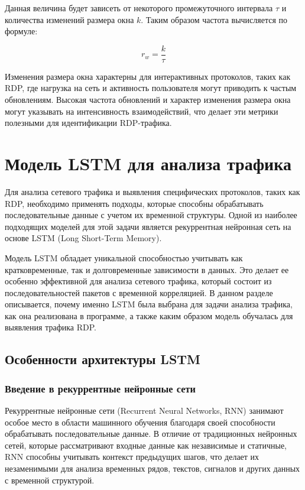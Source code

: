 \documentclass[bachelor, och, coursework]{SCWorks}
\begin{document}
Данная величина будет зависеть от некоторого промежуточного интервала $\tau$ и количества изменений размера окна $k$. Таким образом частота вычисляется по формуле:

\begin{equation}
  r_w = \frac{k}{\tau}
\end{equation}

Изменения размера окна характерны для интерактивных протоколов, таких как RDP, где нагрузка на сеть и активность пользователя могут приводить к частым 
обновлениям. Высокая частота обновлений и характер изменения размера окна могут указывать на интенсивность взаимодействий, что делает эти метрики 
полезными для идентификации RDP-трафика.

\section{Модель LSTM для анализа трафика}

Для анализа сетевого трафика и выявления специфических протоколов, таких как RDP, необходимо применять подходы, которые способны обрабатывать 
последовательные данные с учетом их временной структуры. Одной из наиболее подходящих моделей для этой задачи является рекуррентная нейронная 
сеть на основе LSTM (Long Short-Term Memory).

Модель LSTM обладает уникальной способностью учитывать как кратковременные, так и долговременные зависимости в данных. Это делает ее особенно 
эффективной для анализа сетевого трафика, который состоит из последовательностей пакетов с временной корреляцией. В данном разделе описывается, 
почему именно LSTM была выбрана для задачи анализа трафика, как она реализована в программе, а также каким образом модель обучалась для выявления 
трафика RDP.




\subsection{Особенности архитектуры LSTM}
  \subsubsection{Введение в рекуррентные нейронные сети}
  Рекуррентные нейронные сети (Recurrent Neural Networks, RNN) занимают особое место в области машинного обучения 
  благодаря своей способности обрабатывать последовательные данные. В отличие от традиционных нейронных сетей, которые 
  рассматривают входные данные как независимые и статичные, RNN способны учитывать контекст предыдущих шагов, что делает их незаменимыми 
  для анализа временных рядов, текстов, сигналов и других данных с временной структурой.  
\end{document}

